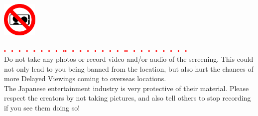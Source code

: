 \ifdefined\COMPLETE
\else
	
	
\fi
\def\pagetitletext{}

\thispagestyle{empty}

\vspace*{-0.25cm}
\vspace*{\fill}

\begin{changemargin}{1cm}{1cm}
\includegraphics[width=1.66cm,keepaspectratio]{images/no_recording.pdf}%
\vspace{-2.5em}
\begin{changemargin}{2cm}{0cm}
\hspace{0.5mm}\includegraphics[height=1mm,keepaspectratio]{images/dots_red.pdf}\hspace{3mm}\includegraphics[height=1mm,keepaspectratio]{images/dots_red.pdf}\hspace{3mm}\includegraphics[trim={0 0 9mm 0},clip,height=1mm,keepaspectratio]{images/dots_red.pdf}\\
\small Do not take any photos or record video and/or audio of the screening. This could not only lead to you being banned from the location, but also hurt the chances of more Delayed Viewings coming to overseas locations.\\
{\footnotesize The Japanese entertainment industry is very protective of their material. Please respect the creators by not taking pictures, and also tell others to stop recording if you see them doing so!}
\end{changemargin}

\vspace*{\fill}


\end{changemargin}

